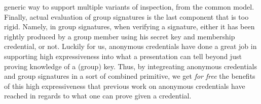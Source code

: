 generic way to support multiple variants of inspection, from the common model.
Finally, actual evaluation of group signatures is the last component that is
too rigid. Namely, in group signatures, when verifying a signature, either it
has been rightly produced by a group member using his secret key and membership
credential, or not. Luckily for us, anonymous credentials have done a great job
in supporting high expressiveness into what a presentation can tell beyond just
proving knowledge of a (group) key. Thus, by integreating anonymous credentials
and group signatures in a sort of combined primitive, we get \emph{for free}
the benefits of this high expressiveness that previous work on anonymous
credentials have reached in regards to what one can prove given a credential.

